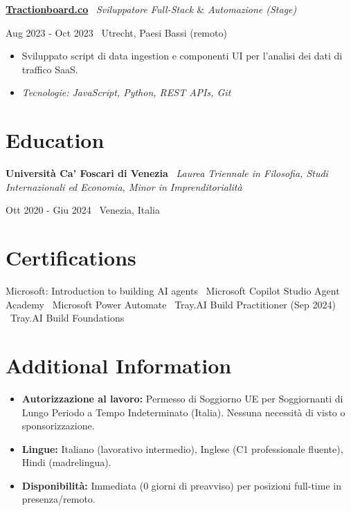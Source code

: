 \documentclass[a4paper,10pt]{article}
\newcommand{\role}[4]{%
  \vspace{2pt}\noindent
  \begin{minipage}[t]{0.70\textwidth}\raggedright\textbf{#1} \textbullet\ \textit{#3}\end{minipage}%
  \hfill
  \begin{minipage}[t]{0.28\textwidth}\raggedleft\footnotesize\color{gray}#2 \textbullet\ #4\end{minipage}%
  \vspace{1pt}%
}
\begin{document}
\role{\href{https://tractionboard.co}{Tractionboard.co}}{Aug 2023 - Oct 2023}{Sviluppatore Full-Stack $\&$ Automazione (Stage)}{Utrecht, Paesi Bassi (remoto)}
\begin{itemize}
  \item Sviluppato script di data ingestion e componenti UI per l'analisi dei dati di traffico SaaS.
  \item \textit{Tecnologie: JavaScript, Python, REST APIs, Git}
\end{itemize}

\section{Education}
\role{Università Ca' Foscari di Venezia}{Ott 2020 - Giu 2024}{Laurea Triennale in Filosofia, Studi Internazionali ed Economia, Minor in Imprenditorialità}{Venezia, Italia}

\section{Certifications}
Microsoft: Introduction to building AI agents \textbullet\ Microsoft Copilot Studio Agent Academy \textbullet\ Microsoft Power Automate \textbullet\ Tray.AI Build Practitioner (Sep 2024) \textbullet\ Tray.AI Build Foundations

\section{Additional Information}
\begin{itemize}
  \item \textbf{Autorizzazione al lavoro:} Permesso di Soggiorno UE per Soggiornanti di Lungo Periodo a Tempo Indeterminato (Italia). Nessuna necessità di visto o sponsorizzazione.
  \item \textbf{Lingue:} Italiano (lavorativo intermedio), Inglese (C1 professionale fluente), Hindi (madrelingua).
  \item \textbf{Disponibilità:} Immediata (0 giorni di preavviso) per posizioni full-time in presenza/remoto.
\end{itemize}

\end{document}
